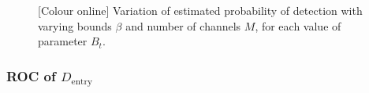 \documentclass[11pt]{article}
\begin{document}
\begin{figure}[h]
\caption{[Colour online] Variation of estimated probability of detection with varying bounds $\beta$ and number of channels $M$, for each value of parameter $B_{t}$.}
\label{fig:MCdentry}
\end{figure}


\subsubsection{ROC of $D_{\text{entry}}$}
\label{subsubsec:entryDetector_roc}
\end{document}
